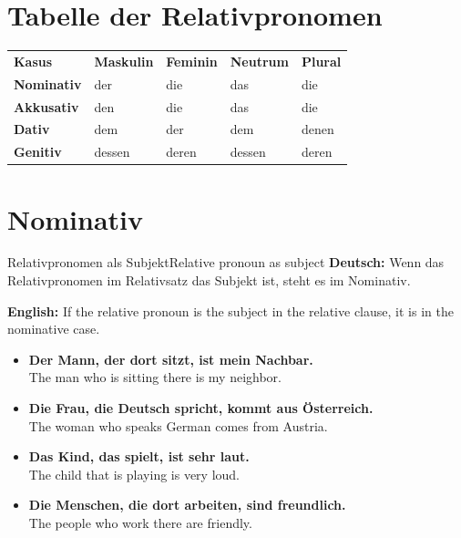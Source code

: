 \documentclass[a4paper,11pt]{article}
\newcommand{\GermanText}[1]{\textbf{Deutsch: }#1\par}
\newcommand{\EnglishText}[1]{{\small\color{SoftGray}\textbf{English: }#1\par}}
\newcommand{\ExampleItem}[2]{\item \textbf{#1}\\{\small\color{SoftGray}#2}}
\begin{document}
    
    \section{Tabelle der Relativpronomen}
        
        \begin{tabular}{>{\bfseries}p{2.7cm} p{2.7cm} p{2.7cm} p{2.7cm} p{2.7cm}}
            \rowcolor{HeaderBlueDark}
            \color{white}\textbf{Kasus} & \color{white}\textbf{Maskulin} & \color{white}\textbf{Feminin} & \color{white}\textbf{Neutrum} & \color{white}\textbf{Plural} \\
            Nominativ                   & der                            & die                           & das                           & die                          \\
            Akkusativ                   & den                            & die                           & das                           & die                          \\
            Dativ                       & dem                            & der                           & dem                           & denen                        \\
            Genitiv                     & dessen                         & deren                         & dessen                        & deren                        \\
        \end{tabular}
    
    
    \section{Nominativ}
        
        \begin{grammarentry}{Relativpronomen als Subjekt}{Relative pronoun as subject}
            \GermanText{Wenn das Relativpronomen im Relativsatz das Subjekt ist, steht es im Nominativ.}
            \EnglishText{If the relative pronoun is the subject in the relative clause, it is in the nominative case.}
            
            \begin{exbox}
                \begin{itemize}
                    \ExampleItem{Der Mann, der dort sitzt, ist mein Nachbar.}{The man who is sitting there is my neighbor.}
                    \ExampleItem{Die Frau, die Deutsch spricht, kommt aus Österreich.}{The woman who speaks German comes from Austria.}
                    \ExampleItem{Das Kind, das spielt, ist sehr laut.}{The child that is playing is very loud.}
                    \ExampleItem{Die Menschen, die dort arbeiten, sind freundlich.}{The people who work there are friendly.}
                \end{itemize}
            \end{exbox}
        \end{grammarentry}
    
\end{document}
